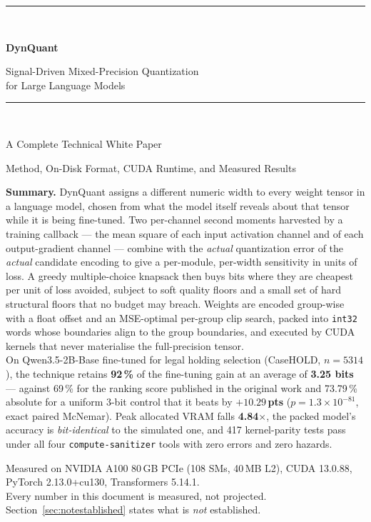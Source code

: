 \documentclass[11pt]{article}
\newcommand{\x}{$\times$}
\newcommand{\pt}{\,pts}
\newcommand{\pct}{\,\%}
\newcommand{\code}[1]{\texttt{#1}}
\begin{document}
\begin{titlepage}
\centering
\vspace*{1.2in}
{\color{dqblue}\rule{\textwidth}{1.2pt}}\\[0.8em]
{\Huge\bfseries DynQuant\par}
\vspace{0.5em}
{\LARGE Signal-Driven Mixed-Precision Quantization\\for Large Language Models\par}
\vspace{0.7em}
{\color{dqblue}\rule{\textwidth}{1.2pt}}\\[2.0em]
{\large A Complete Technical White Paper\par}
\vspace{0.4em}
{\large Method, On-Disk Format, CUDA Runtime, and Measured Results\par}
\vspace{2.5em}

\begin{minipage}{0.86\textwidth}
\small
\textbf{Summary.} DynQuant assigns a different numeric width to every weight tensor in a
language model, chosen from what the model itself reveals about that tensor while it is being
fine-tuned. Two per-channel second moments harvested by a training callback --- the mean square
of each input activation channel and of each output-gradient channel --- combine with the
\emph{actual} quantization error of the \emph{actual} candidate encoding to give a per-module,
per-width sensitivity in units of loss. A greedy multiple-choice knapsack then buys bits where
they are cheapest per unit of loss avoided, subject to soft quality floors and a small set of
hard structural floors that no budget may breach. Weights are encoded group-wise with a float
offset and an MSE-optimal per-group clip search, packed into \code{int32} words whose boundaries
align to the group boundaries, and executed by CUDA kernels that never materialise the
full-precision tensor.
\\[0.7em]
On Qwen3.5-2B-Base fine-tuned for legal holding selection (CaseHOLD, $n=5314$), the technique
retains \textbf{92\pct} of the fine-tuning gain at an average of \textbf{3.25 bits} --- against
69\pct{} for the ranking score published in the original work and 73.79\pct{} absolute for a
uniform 3-bit control that it beats by \textbf{$+10.29$\pt} ($p = 1.3\times10^{-81}$, exact
paired McNemar). Peak allocated VRAM falls \textbf{4.84\x}, the packed model's accuracy is
\emph{bit-identical} to the simulated one, and 417 kernel-parity tests pass under all four
\code{compute-sanitizer} tools with zero errors and zero hazards.
\end{minipage}

\vfill
{\small\color{dqgrey}
Measured on NVIDIA A100 80\,GB PCIe (108 SMs, 40\,MB L2), CUDA 13.0.88,
PyTorch 2.13.0+cu130, Transformers 5.14.1.\\
Every number in this document is measured, not projected. Section~\ref{sec:notestablished}
states what is \emph{not} established.\par}
\vspace{0.6em}
\end{titlepage}
\end{document}
